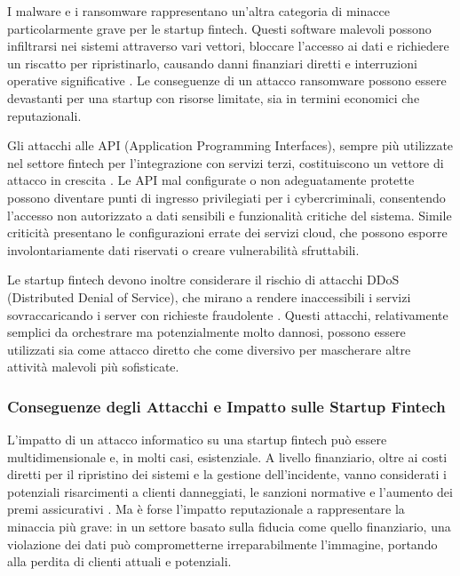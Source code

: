 \documentclass[a4paper,12pt]{report}
\begin{document}
I malware e i ransomware rappresentano un’altra categoria di minacce particolarmente grave per le startup fintech. Questi software malevoli possono infiltrarsi nei sistemi attraverso vari vettori, bloccare l’accesso ai dati e richiedere un riscatto per ripristinarlo, causando danni finanziari diretti e interruzioni operative significative \cite{cyberThreatsFintech}. Le conseguenze di un attacco ransomware possono essere devastanti per una startup con risorse limitate, sia in termini economici che reputazionali.

Gli attacchi alle API (Application Programming Interfaces), sempre più utilizzate nel settore fintech per l’integrazione con servizi terzi, costituiscono un vettore di attacco in crescita \cite{fintechChallenges}. Le API mal configurate o non adeguatamente protette possono diventare punti di ingresso privilegiati per i cybercriminali, consentendo l’accesso non autorizzato a dati sensibili e funzionalità critiche del sistema. Simile criticità presentano le configurazioni errate dei servizi cloud, che possono esporre involontariamente dati riservati o creare vulnerabilità sfruttabili.

Le startup fintech devono inoltre considerare il rischio di attacchi DDoS (Distributed Denial of Service), che mirano a rendere inaccessibili i servizi sovraccaricando i server con richieste fraudolente \cite{fintechChallenges}. Questi attacchi, relativamente semplici da orchestrare ma potenzialmente molto dannosi, possono essere utilizzati sia come attacco diretto che come diversivo per mascherare altre attività malevoli più sofisticate.

\subsubsection*{Conseguenze degli Attacchi e Impatto sulle Startup Fintech}

L’impatto di un attacco informatico su una startup fintech può essere multidimensionale e, in molti casi, esistenziale. A livello finanziario, oltre ai costi diretti per il ripristino dei sistemi e la gestione dell’incidente, vanno considerati i potenziali risarcimenti a clienti danneggiati, le sanzioni normative e l’aumento dei premi assicurativi \cite{fintechChallenges}. Ma è forse l’impatto reputazionale a rappresentare la minaccia più grave: in un settore basato sulla fiducia come quello finanziario, una violazione dei dati può comprometterne irreparabilmente l’immagine, portando alla perdita di clienti attuali e potenziali.
\end{document}
